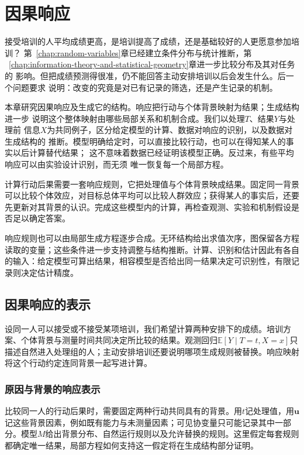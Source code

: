 \chapter{因果响应}
\label{chap:causal-inference}

接受培训的人平均成绩更高，是培训提高了成绩，还是基础较好的人更愿意参加培训？
第~\ref{chap:random-variables}章已经建立条件分布与统计推断，第
~\ref{chap:information-theory-and-statistical-geometry}章进一步比较分布及其对任务的
影响。但把成绩预测得很准，仍不能回答主动安排培训以后会发生什么。后一个问题要求
说明：改变的究竟是对已有记录的筛选，还是产生记录的机制。

本章研究因果响应及生成它的结构。响应把行动与个体背景映射为结果；生成结构进一步
说明这个整体映射由哪些局部关系和机制合成。我们以处理\(T\)、结果\(Y\)与处理前
信息\(X\)为共同例子，区分给定模型的计算、数据对响应的识别，以及数据对生成结构的
推断。模型明确给定时，可以直接比较行动，也可以在得知某人的事实以后计算替代结果；
这不意味着数据已经证明该模型正确。反过来，有些平均响应可以由实验设计识别，而无须
唯一恢复每一个局部方程。

计算行动后果需要一套响应规则，它把处理值与个体背景映成结果。固定同一背景可以比较个体效应，对目标总体平均可以比较人群效应；获得某人的事实后，还要先更新对其背景的认识。完成这些模型内的计算，再检查观测、实验和机制假设是否足以确定答案。

响应规则也可以由局部生成方程逐步合成。无环结构给出求值次序，图保留各方程读取的变量；这些条件进一步支持调整与结构推断。计算、识别和估计因此有各自的输入：给定模型可算出结果，相容模型是否给出同一结果决定可识别性，有限记录则决定估计精度。

\section{因果响应的表示}
\label{sec:causal-response-representation}

设同一人可以接受或不接受某项培训，我们希望计算两种安排下的成绩。培训方案、个体背景与测量时间共同决定所比较的结果。观测回归\(\mathbb E[Y\mid T=t,X=x]\)只描述自然进入处理组的人；主动安排培训还要说明哪项生成规则被替换。响应映射将这个行动约定连同背景一起写进计算。

\subsection{原因与背景的响应表示}
\label{sec:causal-observation-generation}

比较同一人的行动后果时，需要固定两种行动共同具有的背景。用\(t\)记处理值，用\(\bm u\)记这些背景因素，例如既有能力与未测量因素；可见协变量只可能记录其中一部分。模型\(M\)给出背景分布、自然运行规则以及允许替换的规则。这里假定每套规则都确定唯一结果，局部方程如何支持这一假定将在生成结构部分证明。


